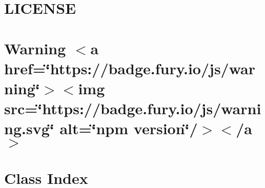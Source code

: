\let\mypdfximage\pdfximage\def\pdfximage{\immediate\mypdfximage}\documentclass[twoside]{book}
\newcommand{\+}{\discretionary{\mbox{\scriptsize$\hookleftarrow$}}{}{}}
\begin{document}
\chapter{LICENSE}
\label{md__c___users_zhart__one_drive__desktop_school_capstone_workspace_capstone_flight_risk_assesment9c19c46ffae8f0b92ef81b9408a16ffe}

\chapter{Warning $<$a href=\char`\"{}https\+://badge.\+fury.\+io/js/warning\char`\"{}$>$$<$img src=\char`\"{}https\+://badge.\+fury.\+io/js/warning.\+svg\char`\"{} alt=\char`\"{}npm version\char`\"{}/$>$$<$/a$>$}
\label{md__c___users_zhart__one_drive__desktop_school_capstone_workspace_capstone_flight_risk_assesmentbecb2794a3da1a2d100b752bdae69cda}

\chapter{Class Index}

\end{document}
